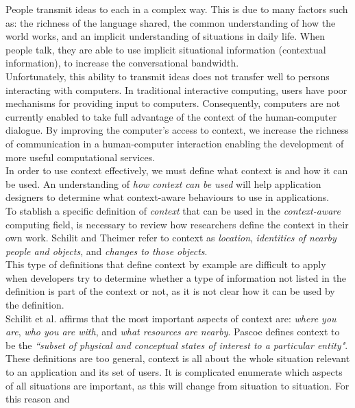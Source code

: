 People transmit ideas to each in a complex way. This
is due to many factors such as: the richness of the language shared, the common
understanding of how the world works, and an implicit understanding of
situations in daily life. When people talk, they are able to use implicit
situational information (contextual information), to increase the
conversational bandwidth. \\Unfortunately, this ability to transmit
ideas does not transfer well to persons interacting with computers. In
traditional interactive computing, users have poor mechanisms for
providing input to computers. Consequently, computers are not
currently enabled to take full advantage of the context of the 
human-computer dialogue. By improving the computer's access to context, 
we increase the richness of communication in a human-computer interaction
enabling the development of more useful computational 
services.\\
In order to use context effectively, we must define what context
is and how it can be used. An understanding of \textit{how context can
be used} will help application designers to determine what 
context-aware behaviours to use in applications\cite{dey2001understanding}.\\
To stablish a specific definition of \textit{context} that can be used
in the \textit{context-aware} computing field, is necessary to review
how researchers define the context in their own work. Schilit and
Theimer\cite{abowd1999towards} refer to context as \textit{location},
\textit{identities of nearby people and objects}, and \textit{changes
to those objects}.\\
This type of definitions that define context by example
are difficult to apply when developers try to determine whether a type of
information not listed in the definition is part of the context or not, 
as it is not clear how it can be used by the definition.\\ 
Schilit et al.\cite{schilit1994context} affirms that the most important
aspects of context are: \textit{where you are}, \textit{who you are
with}, and \textit{what resources are nearby}.
Pascoe\cite{pascoe1998adding} defines context to be the
\textit{``subset of physical and  conceptual states of interest to a
particular entity"}.\\
These definitions are too general, context is all about the
whole situation relevant to an application and its set of users. It is
complicated enumerate which aspects of all situations are important,
as this will change from situation to situation. For this reason and
